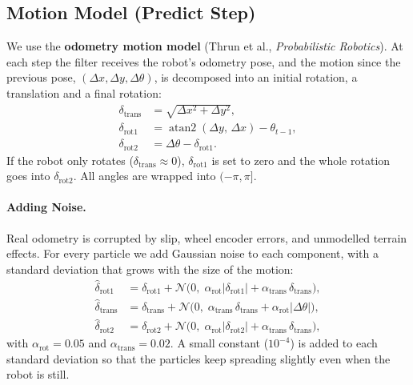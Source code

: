 \documentclass[12pt, a4paper]{article}
\begin{document}
\subsection{Motion Model (Predict Step)}
\label{subsec:motion}


We use the \textbf{odometry motion model} (Thrun et al., \textit{Probabilistic Robotics}).  At each step the filter receives the robot's odometry pose, and the motion since the previous pose, \((\Delta x, \Delta y, \Delta\theta)\), is decomposed into an initial rotation, a translation and a final rotation:
\begin{align}
  \delta_{\text{trans}} &= \sqrt{\Delta x^2 + \Delta y^2}, \label{eq:odom_trans} \\
  \delta_{\text{rot1}}  &= \operatorname{atan2}(\Delta y,\, \Delta x) - \theta_{t-1}, \label{eq:odom_rot1} \\
  \delta_{\text{rot2}}  &= \Delta\theta - \delta_{\text{rot1}}. \label{eq:odom_rot2}
\end{align}
If the robot only rotates (\(\delta_{\text{trans}} \approx 0\)), \(\delta_{\text{rot1}}\) is set to zero and the whole rotation goes into \(\delta_{\text{rot2}}\).  All angles are wrapped into \((-\pi, \pi]\).

\paragraph{Adding Noise.}
Real odometry is corrupted by slip, wheel encoder errors, and unmodelled terrain effects.  For every particle we add Gaussian noise to each component, with a standard deviation that grows with the size of the motion:
\begin{align}
  \hat{\delta}_{\text{rot1}}  &= \delta_{\text{rot1}}  + \mathcal{N}\bigl(0,\; \alpha_{\text{rot}} |\delta_{\text{rot1}}| + \alpha_{\text{trans}}\, \delta_{\text{trans}}\bigr), \label{eq:noise_rot1} \\
  \hat{\delta}_{\text{trans}} &= \delta_{\text{trans}} + \mathcal{N}\bigl(0,\; \alpha_{\text{trans}}\, \delta_{\text{trans}} + \alpha_{\text{rot}} |\Delta\theta|\bigr), \label{eq:noise_trans} \\
  \hat{\delta}_{\text{rot2}}  &= \delta_{\text{rot2}}  + \mathcal{N}\bigl(0,\; \alpha_{\text{rot}} |\delta_{\text{rot2}}| + \alpha_{\text{trans}}\, \delta_{\text{trans}}\bigr), \label{eq:noise_rot2}
\end{align}
with \(\alpha_{\text{rot}} = 0.05\) and \(\alpha_{\text{trans}} = 0.02\).  A small constant (\(10^{-4}\)) is added to each standard deviation so that the particles keep spreading slightly even when the robot is still.
\end{document}
